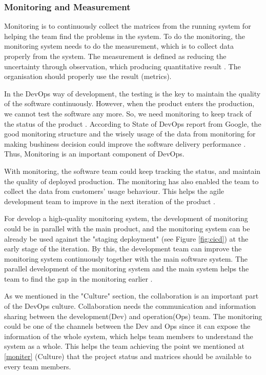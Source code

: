 \subsubsection[]{Monitoring and Measurement}
Monitoring is to continuously collect the matrices from the running system for helping the team find the problems in the system. To do the monitoring, the monitoring system needs to do the measurement, which is to collect data properly from the system. The measurement is defined as reducing the uncertainty through observation, which producing quantitative result \cite{hering2015measure}. The organisation should properly use the result (metrics).
\par
In the DevOps way of development, the testing is the key to maintain the quality of the software continuously. However, when the product enters the production, we cannot test the software any more. So, we need monitoring to keep track of the status of the product \cite{huttermann2012devops}. According to State of DevOps report from Google, the good monitoring structure and the wisely usage of the data from monitoring for making bushiness decision could improve the software delivery performance \cite{forsgrenaccelerate}. Thus, Monitoring is an important component of DevOps.
\par
With monitoring, the software team could keep tracking the status, and maintain the quality of deployed production. The monitoring has also enabled the team to collect the data from customers' usage behaviour. This helps the agile development team to improve in the next iteration of the product \cite{lwakatare2015dimensions}.
\par
For develop a high-quality monitoring system, the development of monitoring could be in parallel with the main product, and the monitoring system can be already be used against the "staging deployment" (see Figure \ref{fig:cicd}) at the early stage of the iteration. By this, the development team can improve the monitoring system continuously together with the main software system. The parallel development of the monitoring system and the main system helps the team to find the gap in the monitoring earlier \cite{huttermann2012devops}.
\par
As we mentioned in the "Culture" section, the collaboration is an important part of the DevOps culture. Collaboration needs the communication and information sharing between the development(Dev) and operation(Ops) team. The monitoring could be one of the channels between the Dev and Ops since it can expose the information of the whole system, which helps team members to understand the system as a whole. This helps the team achieving the point we mentioned at \ref{moniter} (Culture) that the project status and matrices should be available to every team members.
